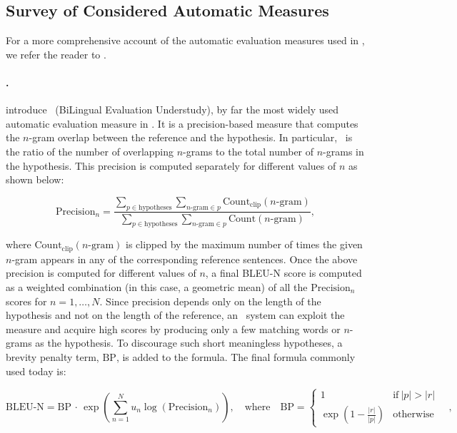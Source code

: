 \subsection{Survey of Considered Automatic Measures}
\label{sub:survey_automatic_measures}

For a more comprehensive account of the automatic evaluation measures used in \nlp, we refer the reader to \citet{sai2022survey, chauhan2023comprehensive}.

\paragraph{\bleu.}
\citet{papineni2002bleu} introduce \bleu\ (BiLingual Evaluation Understudy), by far the most widely used automatic evaluation measure in \nlp. It is a precision-based measure that computes the $n$-gram overlap between the reference and the hypothesis. In particular, \bleu\ is the ratio of the number of overlapping $n$-grams to the total number of $n$-grams in the hypothesis. This
precision is computed separately for different values of $n$ as shown below:

\[ \textrm{Precision}_n = \frac{\sum_{p \in \textrm{hypotheses}} \sum_{n\textrm{-gram} \in p} \textrm{Count}_\textrm{clip} (n\textrm{-gram})}{\sum_{p \in \textrm{hypotheses}} \sum_{n\textrm{-gram} \in p} \textrm{Count} (n\textrm{-gram})}, \]

where $\textrm{Count}_\textrm{clip} (n\textrm{-gram})$ is clipped by the maximum number of times the given $n$-gram appears in any of the corresponding reference sentences. Once the above precision is computed for different values of $n$, a final \textsc{BLEU-N} score is computed as a weighted combination (in this case, a geometric mean) of all the $\textrm{Precision}_n$ scores for $n = 1,\dots,N$. Since precision depends only on the length of the hypothesis and not on the length of the reference, an \nlg\ system can exploit the measure and acquire high scores by producing only a few matching words or $n$-grams as the hypothesis. To discourage such short meaningless hypotheses, a brevity penalty term, $\textrm{BP}$, is added to the formula. The final formula commonly used today is:

\[ \textrm{BLEU-N} = \textrm{BP} \, \cdot \, \exp \left( \sum_{n=1}^N u_n \log \left( \textrm{Precision}_n \right) \right) , \quad \text{where} \quad \textrm{BP} = \begin{cases}
    1 & \text{if}\ |p|>|r| \\
    \exp \left( 1 - \frac{|r|}{|p|} \right) & \text{otherwise}
\end{cases} \quad , \]

